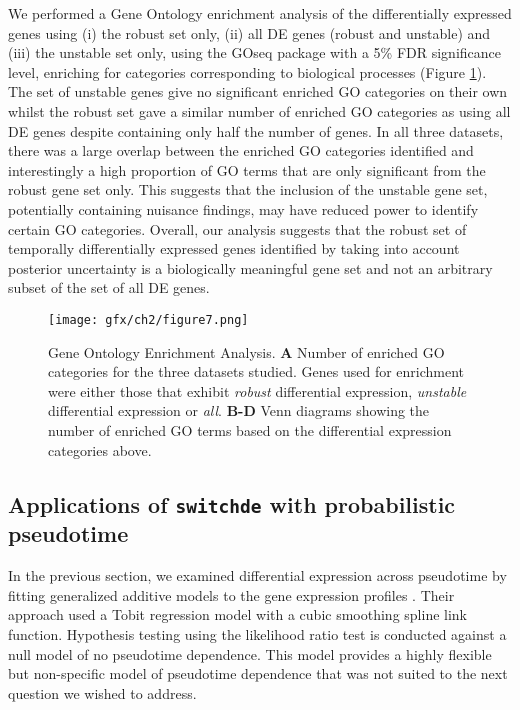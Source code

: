 We performed a Gene Ontology enrichment analysis of the differentially expressed genes using (i) the robust set only, (ii) all DE genes (robust and unstable) and (iii) the unstable set only, using the GOseq package \cite{young2010gene} with a 5\% FDR significance level, enriching for categories corresponding to biological processes (Figure \ref{fig:go_enrichment}). The set of unstable genes give no significant enriched GO categories on their own whilst the robust set gave a similar number of enriched GO categories as using all DE genes despite containing only half the number of genes. In all three datasets, there was a large overlap between the enriched GO categories identified and interestingly a high proportion of GO terms that are only significant from the robust gene set only. This suggests that the inclusion of the unstable gene set, potentially containing nuisance findings, may have reduced power to identify certain GO categories. Overall, our analysis suggests that the robust set of temporally differentially expressed genes identified by taking into account posterior uncertainty is a biologically meaningful gene set and not an arbitrary subset of the set of all DE genes.


\begin{figure}
\centering
	\texttt{[image: gfx/ch2/figure7.png]}
\caption{ Gene Ontology Enrichment Analysis.
\textbf{A} Number of enriched GO categories for the three datasets studied. Genes used for enrichment were either those that exhibit \emph{robust} differential expression, \emph{unstable} differential expression or \emph{all}.
\textbf{B-D} Venn diagrams showing the number of enriched GO terms based on the differential expression categories above.} \label{fig:go_enrichment}
\end{figure}


\subsection{Applications of \texttt{switchde} with probabilistic pseudotime}

In the previous section, we examined differential expression across pseudotime by fitting generalized additive models to the gene expression profiles \cite{Trapnell2014-xi}. Their approach used a Tobit regression model with a cubic smoothing spline link function. Hypothesis testing using the likelihood ratio test is conducted against a null model of no pseudotime dependence. This model provides a highly flexible but non-specific model of pseudotime dependence that was not suited to the next question we wished to address.

